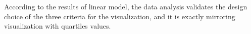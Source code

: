 According to the results of linear model, the data analysis validates the design choice of the three criteria for the visualization, and it is exactly mirroring visualization with quartiles values.









